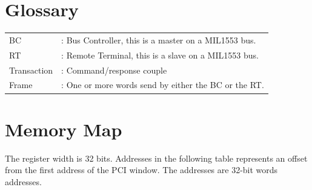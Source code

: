 \documentclass[11pt,a4paper]{article}
\begin{document}


\section{Glossary}

\begin{table}[h!]
  \centering
  \begin{tabularx}{\textwidth}{ l X }
    BC & : Bus Controller, this is a master on a MIL1553 bus. \\
    RT & : Remote Terminal, this is a slave on a MIL1553 bus. \\
    Transaction & : Command/response couple \\
    Frame & : One or more words send by either the BC or the RT. \\
  \end{tabularx}
\end{table}


\newpage
\section{Memory Map}
The register width is 32 bits. Addresses in the following table represents an offset from the first address of the PCI window.
The addresses are 32-bit words addresses.
\end{document}
